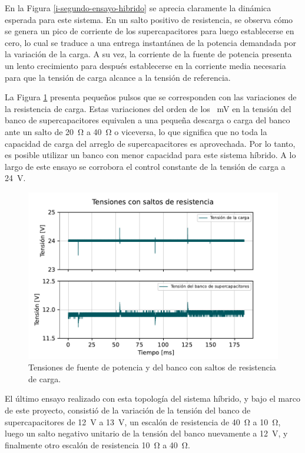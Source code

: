 En la Figura \ref{i-segundo-ensayo-hibrido} se aprecia claramente la dinámica esperada para este sistema. En un salto positivo de resistencia, se observa cómo se genera un pico de corriente de los supercapacitores para luego establecerse en cero, lo cual se traduce a una entrega instantánea de la potencia demandada por la variación de la carga. A su vez, la corriente de la fuente de potencia presenta un lento crecimiento para después establecerse en la corriente media necesaria para que la tensión de carga alcance a la tensión de referencia.

La Figura \ref{u-segundo-ensayo-hibrido} presenta pequeños pulsos que se corresponden con las variaciones de la resistencia de carga. Estas variaciones del orden de los \SI{}{\milli\volt} en la tensión del banco de supercapacitores equivalen a una pequeña descarga o carga del banco ante un salto de \SI{20}{\ohm} a \SI{40}{\ohm} o viceversa, lo que significa que no toda la capacidad de carga del arreglo de supercapacitores es aprovechada. Por lo tanto, es posible utilizar un banco con menor capacidad para este sistema híbrido. A lo largo de este ensayo se corrobora el control constante de la tensión de carga a \SI{24}{\volt}.

\begin{figure}[hbt!]
  \centering
  \includegraphics[width=0.53\columnwidth]{Imágenes/Ensayos/Con módulos de almacenamiento/Supercapacitores/Con fuente de potencia/Segundo ensayo/Tensiones con saltos de resistencia.pdf}
  \caption{Tensiones de fuente de potencia y del banco con saltos de resistencia de carga.}
  \label{u-segundo-ensayo-hibrido}
\end{figure}

El último ensayo realizado con esta topología del sistema híbrido, y bajo el marco de este proyecto, consistió de la variación de la tensión del banco de supercapacitores de \SI{12}{\volt} a \SI{13}{\volt}, un escalón de resistencia de \SI{40}{\ohm} a \SI{10}{\ohm}, luego un salto negativo unitario de la tensión del banco nuevamente a \SI{12}{\volt}, y finalmente otro escalón de resistencia \SI{10}{\ohm} a \SI{40}{\ohm}.

